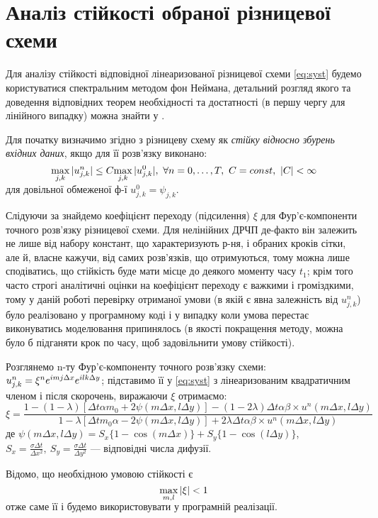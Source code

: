 \section{Аналіз стійкості обраної різницевої схеми}
Для аналізу стійкості відповідної лінеаризованої різницевої схеми \eqref{eq:syst} будемо користуватися спектральним методом фон Неймана, детальний розгляд якого та
доведення відповідних теорем необхідності та достатності (в першу чергу для лінійного випадку) можна знайти у \cite{godun, richt}. 

Для початку визначимо згідно з \cite{godun} різницеву схему як \textit{стійку відносно збурень вхідних даних}, якщо для її розв’язку виконано:
\begin{equation}
\smash{\displaystyle\max_{j,k} |\un{0}{0}|} \le  C\smash{\displaystyle\max_{j,k} |u^0_{j,k}|},\  \forall n = 0, \dots, T,\ C = const,\ |C| < \infty
\end{equation}
для довільної обмеженої ф-ї $u^0_{j,k} = \psi_{j,k}$.

Слідуючи за \cite{richt} знайдемо коефіцієнт переходу (підсилення) $\xi$ для Фур’є-компоненти точного розв’язку різницевої схеми. Для нелінійних ДРЧП де-факто він залежить не лише від набору констант, що характеризують р-ня, і обраних кроків сітки, але й, власне кажучи, від самих розв’язків, що отримуються, тому можна лише сподіватись, що стійкість буде мати місце до деякого моменту часу $t_1$; крім того часто строгі аналітичні оцінки на коефіцієнт переходу є важкими і громіздкими, тому у даній роботі перевірку отриманої умови (в якій є явна залежність від $u^n_{j,k}$) було реалізовано у програмному коді і у випадку коли умова перестає виконуватись моделювання припинялось (в якості покращення методу, можна було б підганяти крок по часу, щоб задовільнити умову стійкості).

Розглянемо n-ту Фур’є-компоненту точного розв’язку схеми: $\un{0}{0} = \xi^ne^{imj\Delta x}e^{ilk\Delta y}$; підставимо її у \eqref{eq:syst} з лінеаризованим квадратичним членом і після скорочень, виражаючи $\xi$ отримаємо:
\begin{equation}
\xi = \frac{1 - (1-\lambda)\left[\Delta t\alpha m_0 + 2\psi\left(m\Delta x, l\Delta y\right)\right] - (1-2\lambda)\Delta t\alpha\beta\times u^n\left(m\Delta x, l\Delta y\right)}
{1 - \lambda\left[\Delta t m_0\alpha - 2\psi\left(m\Delta x, l\Delta y\right)\right] + 2\lambda\Delta t\alpha\beta\times u^n\left(m\Delta x, l\Delta y\right)} \label{eq:stable}
\end{equation}
де $\psi(m\Delta x, l\Delta y) = S_x\{1-\cos(m\Delta x)\} + S_y\{1-\cos(l\Delta y)\}$, $S_x = \frac{\sigma\Delta t}{\Delta x^2},\ S_y = \frac{\sigma\Delta t}{\Delta y^2}$ --- відповідні числа дифузії.

Відомо, що необхідною умовою стійкості є
\begin{equation}
\smash{\displaystyle\max_{m,l} |\xi|} < 1
\end{equation}
отже саме її і будемо використовувати у програмній реалізації.
